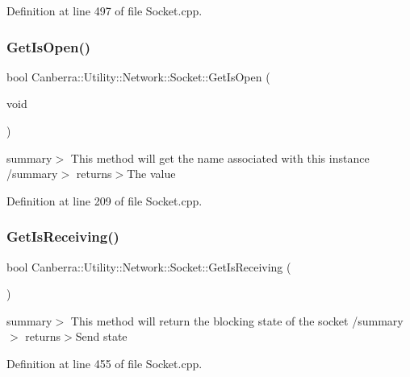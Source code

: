 Definition at line 497 of file Socket.\+cpp.

\mbox{\label{class_canberra_1_1_utility_1_1_network_1_1_socket_a2e9ac3c2718818efc8a555104af88447_a2e9ac3c2718818efc8a555104af88447}} 
\subsubsection{\texorpdfstring{Get\+Is\+Open()}{GetIsOpen()}}
{\footnotesize\ttfamily bool Canberra\+::\+Utility\+::\+Network\+::\+Socket\+::\+Get\+Is\+Open (\begin{DoxyParamCaption}\item[{void}]{ }\end{DoxyParamCaption})}

summary$>$ This method will get the name associated with this instance /summary$>$ returns$>$The value

Definition at line 209 of file Socket.\+cpp.

\mbox{\label{class_canberra_1_1_utility_1_1_network_1_1_socket_a70799039186510f37c795c475c75cf48_a70799039186510f37c795c475c75cf48}} 
\subsubsection{\texorpdfstring{Get\+Is\+Receiving()}{GetIsReceiving()}}
{\footnotesize\ttfamily bool Canberra\+::\+Utility\+::\+Network\+::\+Socket\+::\+Get\+Is\+Receiving (\begin{DoxyParamCaption}{ }\end{DoxyParamCaption})}

summary$>$ This method will return the blocking state of the socket /summary$>$ returns$>$Send state

Definition at line 455 of file Socket.\+cpp.

